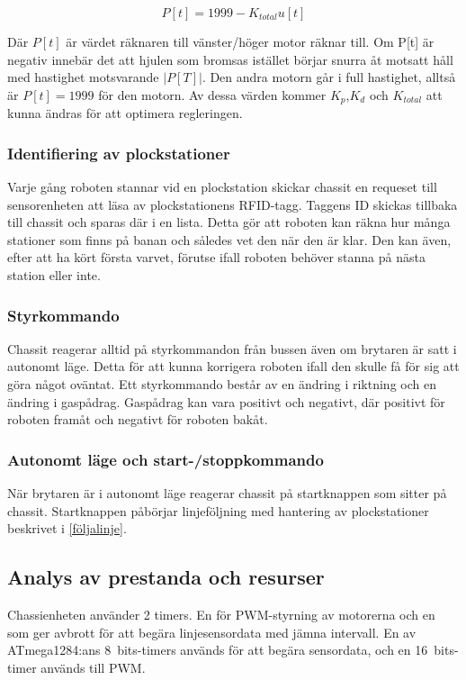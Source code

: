 $$P[t] = 1999 - K_{total}u[t]$$

Där $P[t]$ är värdet räknaren till vänster/höger motor räknar till. Om P[t] är negativ innebär det att hjulen som bromsas istället börjar snurra åt motsatt håll med hastighet motsvarande $|P[T]|$. Den andra motorn går i full hastighet, alltså är $P[t] = 1999$ för den motorn. Av dessa värden kommer $K_{p}$,$K_{d}$ och $K_{total}$ att kunna ändras för att optimera regleringen.


\subsubsection{Identifiering av plockstationer}

Varje gång roboten stannar vid en plockstation skickar chassit en requeset till sensorenheten att läsa av plockstationens RFID-tagg. Taggens ID skickas tillbaka till chassit och sparas där i en lista. Detta gör att roboten kan räkna hur många stationer som finns på banan och således vet den när den är klar. Den kan även, efter att ha kört första varvet, förutse ifall roboten behöver stanna på nästa station eller inte. 


\subsubsection{Styrkommando}

Chassit reagerar alltid på styrkommandon från bussen även om brytaren är satt i autonomt läge. Detta för att kunna korrigera roboten ifall den skulle få för sig att göra något oväntat. Ett styrkommando består av en ändring i riktning och en ändring i gaspådrag. Gaspådrag kan vara positivt och negativt, där positivt för roboten framåt och negativt för roboten bakåt. 


\subsubsection{Autonomt läge och start-/stoppkommando}

När brytaren är i autonomt läge reagerar chassit på startknappen som sitter på chassit. Startknappen påbörjar linjeföljning med hantering av plockstationer beskrivet i \ref{följalinje}.

\subsection{Analys av prestanda och resurser}

Chassienheten använder 2 timers. En för PWM-styrning av motorerna och en som ger avbrott för att begära linjesensordata med jämna intervall. En av ATmega1284:ans 8~bits-timers används för att begära sensordata, och en 16~bits-timer används till PWM.




